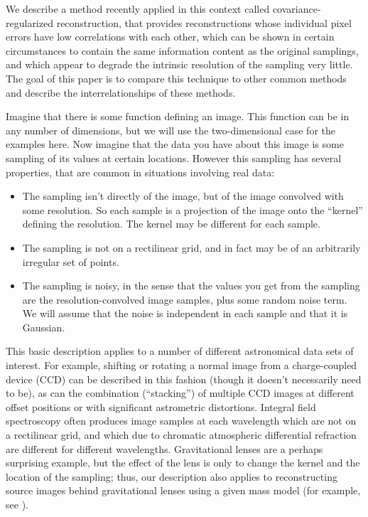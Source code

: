 \documentclass[twocolumn,tighten]{aastex61}
\begin{document}
We describe a method recently applied in this context called
covariance-regularized reconstruction, that provides reconstructions
whose individual pixel errors have low correlations with each other,
which can be shown in certain circumstances to contain the same
information content as the original samplings, and which appear to
degrade the intrinsic resolution of the sampling very little. The goal
of this paper is to compare this technique to other common methods and
describe the interrelationships of these methods.

Imagine that there is some function defining an image. This function
can be in any number of dimensions, but we will use the
two-dimensional case for the examples here.  Now imagine that the data
you have about this image is some sampling of its values at certain
locations. However this sampling has several properties, that are
common in situations involving real data:
\begin{itemize}
 \item The sampling isn't directly of the image, but of the image
   convolved with some resolution. So each sample is a projection of
   the image onto the ``kernel'' defining the resolution. The kernel
   may be different for each sample. 
\item The sampling is not on a rectilinear grid, and in fact may be of
  an arbitrarily irregular set of points.
\item The sampling is noisy, in the sense that the values you get from
  the sampling are the resolution-convolved image samples, plus some
  random noise term. We will assume that the noise is independent in
  each sample and that it is Gaussian.
\end{itemize}

This basic description applies to a number of different astronomical
data sets of interest. For example, shifting or rotating a normal
image from a charge-coupled device (CCD) can be described in this
fashion (though it doesn't necessarily need to be), as can the
combination (``stacking'') of multiple CCD images at different offset
positions or with significant astrometric distortions. Integral field
spectroscopy often produces image samples at each wavelength which are
not on a rectilinear grid, and which due to chromatic atmospheric
differential refraction are different for different
wavelengths. Gravitational lenses are a perhaps surprising example,
but the effect of the lens is only to change the kernel and the
location of the sampling; thus, our description also applies to
reconstructing source images behind gravitational lenses using a given
mass model (for example, see \citealt{warren03a, birrer15a}).
\end{document}
